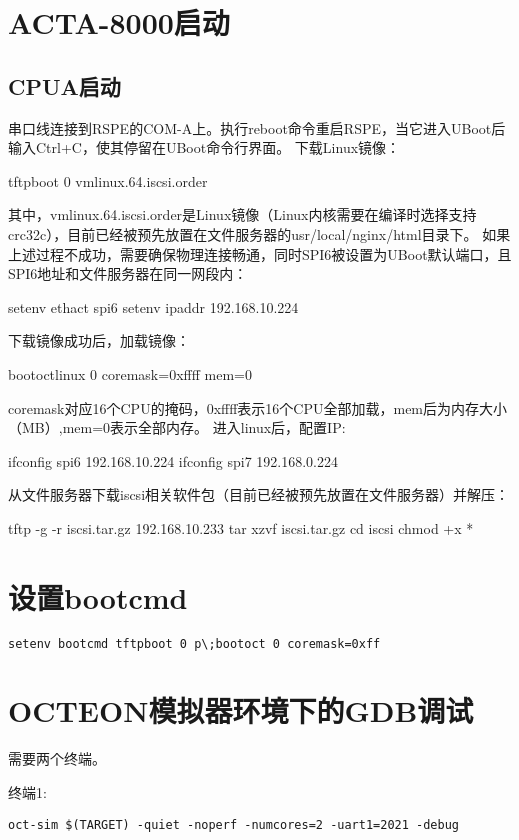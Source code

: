 \section{ACTA-8000启动}
\subsection{CPUA启动}
串口线连接到RSPE的COM-A上。执行reboot命令重启RSPE，当它进入UBoot后输入Ctrl+C，使其停留在UBoot命令行界面。
下载Linux镜像：
\begin{shellcmd}
tftpboot 0 vmlinux.64.iscsi.order
\end{shellcmd}

其中，vmlinux.64.iscsi.order是Linux镜像（Linux内核需要在编译时选择支持crc32c），目前已经被预先放置在文件服务器的usr/local/nginx/html目录下。
如果上述过程不成功，需要确保物理连接畅通，同时SPI6被设置为UBoot默认端口，且SPI6地址和文件服务器在同一网段内：
\begin{shellcmd}
setenv ethact spi6
setenv ipaddr 192.168.10.224
\end{shellcmd}

下载镜像成功后，加载镜像：
\begin{shellcmd}
bootoctlinux 0 coremask=0xffff mem=0
\end{shellcmd}

coremask对应16个CPU的掩码，0xffff表示16个CPU全部加载，mem后为内存大小（MB）,mem=0表示全部内存。
进入linux后，配置IP:
\begin{shellcmd}
ifconfig spi6 192.168.10.224
ifconfig spi7 192.168.0.224
\end{shellcmd}

从文件服务器下载iscsi相关软件包（目前已经被预先放置在文件服务器）并解压：
\begin{shellcmd}
tftp -g -r iscsi.tar.gz 192.168.10.233
tar xzvf iscsi.tar.gz
cd iscsi
chmod +x *
\end{shellcmd}

\section{设置bootcmd}
\begin{verbatim}
setenv bootcmd tftpboot 0 p\;bootoct 0 coremask=0xff
\end{verbatim}
\section{OCTEON模拟器环境下的GDB调试}
需要两个终端。

终端1:
\begin{verbatim}
oct-sim $(TARGET) -quiet -noperf -numcores=2 -uart1=2021 -debug
\end{verbatim}


